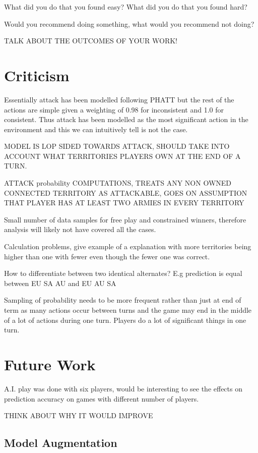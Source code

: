 \documentclass[parskip]{cs4rep}
\begin{document}
What did you do that you found easy? What did you do that you found hard? 

Would you recommend doing something, what would you recommend not doing?

TALK ABOUT THE OUTCOMES OF YOUR WORK!

\section{Criticism}

Essentially attack has been modelled following PHATT but the rest of the actions are simple given a weighting of 0.98 for inconsistent and 1.0 for consistent. Thus attack has been modelled as the most significant action in the environment and this we can intuitively tell is not the case.

MODEL IS LOP SIDED TOWARDS ATTACK, SHOULD TAKE INTO ACCOUNT WHAT TERRITORIES PLAYERS OWN AT THE END OF A TURN.

ATTACK probability COMPUTATIONS, TREATS ANY NON OWNED CONNECTED TERRITORY AS ATTACKABLE, GOES ON ASSUMPTION THAT PLAYER HAS AT LEAST TWO ARMIES IN EVERY TERRITORY

Small number of data samples for free play and constrained winners, therefore analysis will likely not have covered all the cases.

Calculation problems, give example of a explanation with more territories being higher than one with fewer even though the fewer one was correct.

How to differentiate between two identical alternates? E.g prediction is equal between EU SA AU and EU AU SA 

Sampling of probability needs to be more frequent rather than just at end of term as many actions occur between turns and the game may end in the middle of a lot of actions during one turn. Players do a lot of significant things in one turn.

\section{Future Work}

A.I. play was done with six players, would be interesting to see the effects on prediction accuracy on games with different number of players.

THINK ABOUT WHY IT WOULD IMPROVE

\subsection{Model Augmentation}
\end{document}
